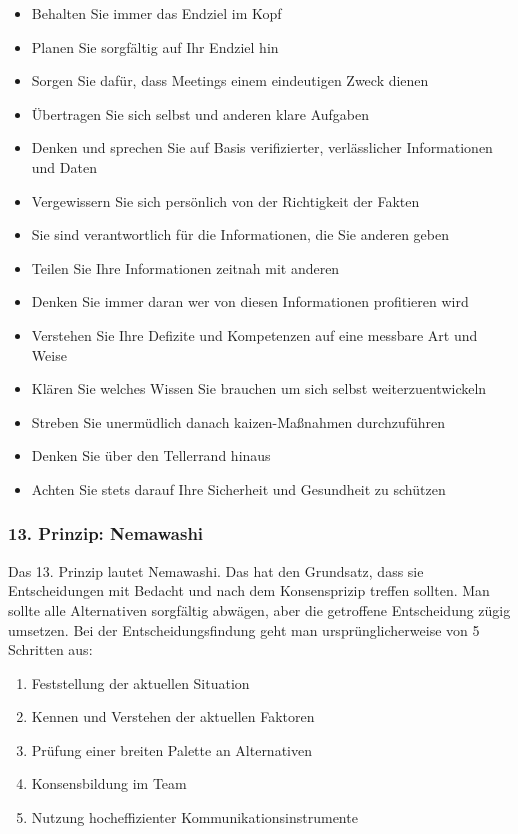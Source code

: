 \documentclass[a4paper,12pt]{scrartcl}
\begin{document}
\begin{itemize}
    \item Behalten Sie immer das Endziel im Kopf
    \item Planen Sie sorgfältig auf Ihr Endziel hin
    \item Sorgen Sie dafür, dass Meetings einem eindeutigen Zweck dienen
    \item Übertragen Sie sich selbst und anderen klare Aufgaben
    \item Denken und sprechen Sie auf Basis verifizierter, verlässlicher Informationen und Daten
    \item Vergewissern Sie sich persönlich von der Richtigkeit der Fakten
    \item Sie sind verantwortlich für die Informationen, die Sie anderen geben
    \item Teilen Sie Ihre Informationen zeitnah mit anderen
    \item Denken Sie immer daran wer von diesen Informationen profitieren wird
    \item Verstehen Sie Ihre Defizite und Kompetenzen auf eine messbare Art und Weise
    \item Klären Sie welches Wissen Sie brauchen um sich selbst weiterzuentwickeln
    \item Streben Sie unermüdlich danach kaizen-Maßnahmen durchzuführen
    \item Denken Sie über den Tellerrand hinaus
    \item Achten Sie stets darauf Ihre Sicherheit und Gesundheit zu schützen
\end{itemize}

\subsubsection{13. Prinzip: Nemawashi}

Das 13. Prinzip lautet Nemawashi. Das hat den Grundsatz, dass sie Entscheidungen mit Bedacht und nach dem Konsensprizip treffen sollten. Man sollte alle Alternativen sorgfältig abwägen, aber die getroffene Entscheidung zügig umsetzen. Bei der Entscheidungsfindung geht man ursprünglicherweise von 5 Schritten aus:

\begin{enumerate}
    \item Feststellung der aktuellen Situation
    \item Kennen und Verstehen der aktuellen Faktoren
    \item Prüfung einer breiten Palette an Alternativen
    \item Konsensbildung im Team
    \item Nutzung hocheffizienter Kommunikationsinstrumente
\end{enumerate}
\end{document}
